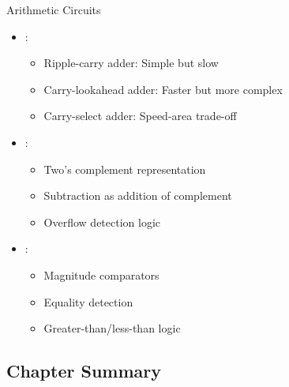 \begin{frame}{Arithmetic Circuits}
\begin{itemize}
\item {}:
\begin{itemize}
\item Ripple-carry adder: Simple but slow
\item Carry-lookahead adder: Faster but more complex
\item Carry-select adder: Speed-area trade-off
\end{itemize}
\vspace{0.5cm}
\item {}:
\begin{itemize}
\item Two's complement representation
\item Subtraction as addition of complement
\item Overflow detection logic
\end{itemize}
\vspace{0.5cm}
\item {}:
\begin{itemize}
\item Magnitude comparators
\item Equality detection
\item Greater-than/less-than logic
\end{itemize}
\end{itemize}
\end{frame}

\subsection{Chapter Summary}

